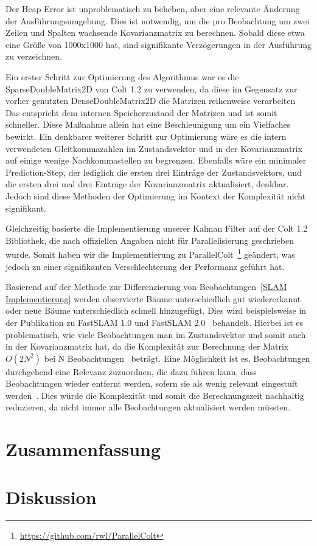 \documentclass[11pt]{article}
\begin{document}
Der Heap Error ist unproblematisch zu beheben, aber eine relevante Änderung der Ausführungsumgebung. Dies ist notwendig, um die pro Beobachtung um zwei Zeilen und Spalten wachsende Kovarianzmatrix zu berechnen. Sobald diese etwa eine Größe von 1000x1000 hat, sind signifikante Verzögerungen in der Ausführung zu verzeichnen.

Ein erster Schritt zur Optimierung des Algorithmus war es die SparseDoubleMatrix2D von Colt 1.2 zu verwenden, da diese im Gegensatz zur vorher genutzten DenseDoubleMatrix2D die Matrizen reihenweise verarbeiten Das entspricht dem internen Speicherzustand der Matrizen und ist somit schneller. Diese Maßnahme allein hat eine Beschleunigung um ein Vielfaches bewirkt. Ein denkbarer weiterer Schritt zur Optimierung wäre es die intern verwendeten Gleitkommazahlen im Zustandsvektor und in der Kovarianzmatrix auf einige wenige Nachkommastellen zu begrenzen. Ebenfalls wäre ein minimaler Prediction-Step, der lediglich die ersten drei Einträge der Zustandsvektors, und die ersten drei mal drei Einträge der Kovarianzmatrix aktualisiert, denkbar. Jedoch sind diese Methoden der Optimierung im Kontext der Komplexität nicht signifikant.

Gleichzeitig basierte die Implementierung unserer Kalman Filter auf der Colt 1.2 Bibliothek, die nach offiziellen Angaben nicht für Parallelisierung geschrieben wurde. Somit haben wir die Implementierung zu ParallelColt~\footnote{\url{https://github.com/rwl/ParallelColt}} geändert, was jedoch zu einer signifikanten Verschlechterung der Performanz geführt hat.

Basierend auf der Methode zur Differenzierung von Beobachtungen~\ref{SLAM Implementierung} werden observierte Bäume unterschiedlich gut wiedererkannt oder neue Bäume unterschiedlich schnell hinzugefügt. Dies wird beispielsweise in der Publikation zu FastSLAM 1.0 und FastSLAM 2.0~\cite{thrun_fastslam_nodate} behandelt. Hierbei ist es problematisch, wie viele Beobachtungen man im Zustandsvektor und somit auch in der Kovarianzmatrix hat, da die Komplexität zur Berechnung der Matrix $O(2N^2)$ bei N Beobachtungen~\cite{ute_SLAM} beträgt. Eine Möglichkeit ist es, Beobachtungen durchgehend eine Relevanz zuzuordnen, die dazu führen kann, dass Beobachtungen wieder entfernt werden, sofern sie als wenig relevant eingestuft werden~\cite{thrun_fastslam_nodate}. Dies würde die Komplexität und somit die Berechnungszeit nachhaltig reduzieren, da nicht immer alle Beobachtungen aktualisiert werden müssten.

\section{Zusammenfassung}\label{Zusammenfassung}

\section{Diskussion}\label{Diskussion}



\end{document}
